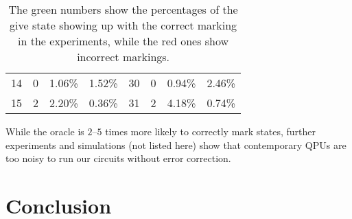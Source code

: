 \documentclass[reqno, 10pt]{amsart}
\numberwithin{equation}{section}                %
\begin{document}
\begin{table}[ht]
\begin{tabular}{|l|c|c|c||l|c|c|c|}
      14 & 0 & {\color{Red} 1.06\%} & {\color{ForestGreen} 1.52\%} & 30 & 0 & {\color{Red} 0.94\%} & {\color{ForestGreen} 2.46\%} \\
      15 & 2 & {\color{ForestGreen} 2.20\%} & {\color{Red} 0.36\%} & 31 & 2 & {\color{ForestGreen} 4.18\%} & {\color{Red} 0.74\%} \\
      \hline
   \end{tabular}
   \caption{The {\color{ForestGreen} green} numbers show the percentages of the give state showing up with the correct marking in the experiments, while the {\color{Red} red} ones show incorrect markings.}
   \label{table:oracle}
\end{table}

While the oracle is $2$--$5$ times more likely to correctly mark states, further experiments and simulations (not listed here) show that contemporary QPUs are too noisy to run our circuits without error correction.

\bigskip

\section{Conclusion}
\label{sec:conclusion}



   
\end{document}
